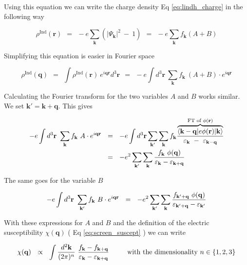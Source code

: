 \documentclass[10pt]{report}
\numberwithin{equation}{chapter}
\newcommand{\refEq}[1]{
  Eq  \ref{#1}
}
\newcommand{\vc}[1]{ %
  \mathbf{#1}
}
\begin{document}
Using this equation we can write the charge density \refEq{eq:lindh_charge} in the following way

\begin{equation}
  \rho^\text{Ind}(\mathbf{r}) 
  ~~=~~ -e \sum_{\mathbf{k}} \left( |\Psi_\mathbf{k}|^2 ~-~ 1 \right)
  ~~=~~ -e \sum_{\mathbf{k}} f_\mathbf{k} (A+B)
\end{equation}


Simplifying this equation is easier in Fourier space

\begin{equation}
  \rho^\text{Ind}(\mathbf{q}) ~~=~~ \int \rho^\text{Ind}(\mathbf{r})\ e^{i\mathbf{q} \mathbf{r}} d^3\mathbf{r} 
  ~~=~~ -e \int d^3\mathbf{r}\ \sum_\mathbf{k} f_\mathbf{k}\ (A+B) \cdot e^{i\mathbf{q} \mathbf{r}}
\end{equation}

Calculating the Fourier transform for the two variables $A$ and $B$ works similar. We set $\mathbf{k}' = \mathbf{k} + \mathbf{q}$. This gives

\begin{align}
  -e \int d^3\vc{r}\ \sum_\vc{k} f_\vc{k}\ A \cdot e^{i\vc{q}\vc{r}} 
  ~~& =~~ -e \int d^3 \vc{r} \sum_{\vc{k}'} \sum_\vc{k} f_\vc{k}
  \frac{\overbrace{\langle \vc{k}-\vc{q}| e\phi(\vc{r})|\vc{k}\rangle}^{\text{FT of } \phi(\vc{r})}}{\varepsilon_\vc{k} ~-~ \varepsilon_{\vc{k}-\vc{q}}} \nonumber \\
  ~~& =~~ -e^2 \sum_{\vc{k}'} \sum_\vc{k} \frac{f_\vc{k}\ \phi(\vc{q})}{\varepsilon_\vc{k} - \varepsilon_{\vc{k}+\vc{q}}}
\end{align}


The same goes for the variable $B$

\begin{equation}
  -e \int d^3\vc{r}\ \sum_{\vc{k}'} f_\vc{k}\ B \cdot e^{i\vc{q}\vc{r}} 
  ~~=~~ -e^2 \sum_{\vc{k}'} \sum_\vc{k} \frac{f_{\vc{k}'+\vc{q}}\ \phi(\vc{q})}{\varepsilon_{\vc{k}'+\vc{q}} - \varepsilon_{\vc{k}'}}
\end{equation}



With these expressions for $A$ and $B$ and the definition of the electric susceptibility $\chi(\vc{q})$ (\refEq{eq:screen_suscept}) we can write

\begin{equation}
  \chi(\vc{q}) ~~\propto~~ \int \frac{d^2 \vc{k}}{(2\pi)^n}\ \frac{f_\vc{k} - f_{\vc{k}+\vc{q}}}{\varepsilon_\vc{k} - \varepsilon_{\vc{k}+\vc{q}}}
  ~~~~~~~~\text{with the dimensionality}~ n \in \{1,2,3\} 
\end{equation}
\end{document}

